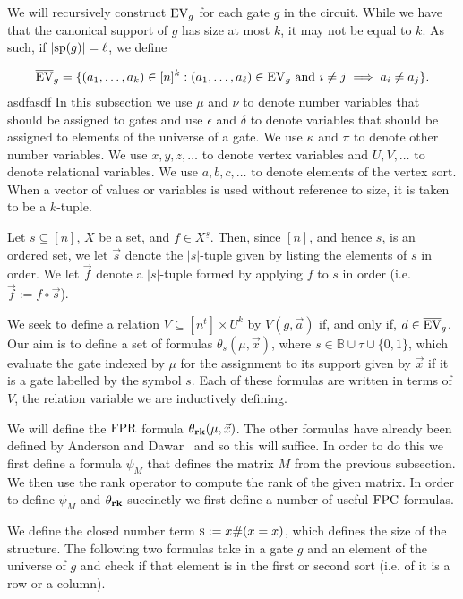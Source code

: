 \documentclass[../paper.tex]{subfiles}
\begin{document}
We will recursively construct $\text{EV}_g$ for each gate $g$ in the circuit. While we
have that the canonical support of $g$ has size at most $k$, it may not be equal
to $k$. As such, if $\vert \text{sp}(g) \vert = \ell$, we define

\begin{align*}
	\overline{\text{EV}}_g = \{ (a_1, \ldots , a_k) \in [n]^k : (a_1 , \ldots , a_\ell ) \in \text{EV}_g \text{ and } i \neq j \implies a_i \neq a_j \}. 
\end{align*}
asdfasdf In this subsection we use $\mu$ and $\nu$ to denote number variables
that should be assigned to gates and use $\epsilon$ and $\delta$ to denote
variables that should be assigned to elements of the universe of a gate. We use
$\kappa$ and $\pi$ to denote other number variables. We use $x, y, z, \ldots$ to
denote vertex variables and $U, V, \ldots$ to denote relational variables. We
use $a, b, c , \ldots$ to denote elements of the vertex sort. When a vector of
values or variables is used without reference to size, it is taken to be a
$k$-tuple.

Let $s \subseteq [n]$, $X$ be a set, and $f \in X^{\underline{s}}$. Then, since
$[n]$, and hence $s$, is an ordered set, we let $\vec{s}$ denote the $\vert s
\vert$-tuple given by listing the elements of $s$ in order. We let $\vec{f}$
denote a $\vert s \vert$-tuple formed by applying $f$ to $s$ in order (i.e.
$\vec{f} := f \circ \vec{s}$).

We seek to define a relation $V \subseteq [n^t] \times U^k$ by $V(g, \vec{a})$
if, and only if, $\vec{a} \in \overline {\text{EV}}_g$. Our aim is to define a set of
formulas $\theta_s (\mu, \vec{x})$, where $s \in \mathbb{B} \cup \tau \cup
\{0,1\}$, which evaluate the gate indexed by $\mu$ for the assignment to its
support given by $\vec{x}$ if it is a gate labelled by the symbol $s$. Each of
these formulas are written in terms of $V$, the relation variable we are
inductively defining.

We will define the $\text{\upshape FPR}$ formula $\theta_{\text{\textbf{rk}}} (\mu, \vec{x})$. The other
formulas have already been defined by Anderson and Dawar~\cite{AndersonD17} and
so this will suffice. In order to do this we first define a formula $\psi_M$
that defines the matrix $M$ from the previous subsection. We then use the rank
operator to compute the rank of the given matrix. In order to define $\psi_M$
and $\theta_{\text{\textbf{rk}}}$ succinctly we first define a number of useful $\text{\upshape FPC}$
formulas.

We define the closed number term $\textsc{s} := x\# (x = x)$, which defines the size
of the structure. The following two formulas take in a gate $g$ and an element
of the universe of $g$ and check if that element is in the first or second sort
(i.e. of it is a row or a column).
\end{document}
